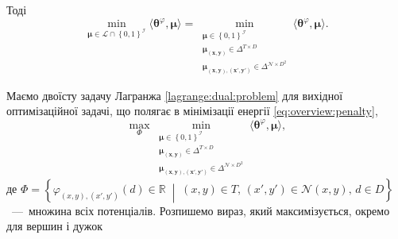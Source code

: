 Тоді
\begin{equation*}
    \min \limits_{\pmb{\mu} \in \mathcal{L} \cap \left\{0, 1 \right\}^{\mathcal{I}}}
        \langle \pmb{\theta}^{\varphi}, \pmb{\mu} \rangle =
    \min \limits_{\substack{\pmb{\mu} \in \left\{ 0, 1 \right\}^{\mathcal{I}} \\
                            \pmb{\mu_{\left(x, y \right)}} \in \Delta^{T \times D} \\
                            \pmb{\mu_{\left(x, y \right), \left(x', y' \right)}} \in
                                \Delta^{\mathcal{N} \times D^2}}}
        \langle \pmb{\theta}^{\varphi}, \pmb{\mu} \rangle.
\end{equation*}

Маємо двоїсту задачу Лагранжа \eqref{lagrange:dual:problem}
для вихідної оптимізаційної задачі,
що полягає в мінімізації енергії \eqref{eq:overview:penalty},
\begin{equation*}
    \max \limits_{\Phi}
        \min \limits_{\substack{\pmb{\mu} \in \left\{ 0, 1 \right\}^{\mathcal{I}} \\
                                \pmb{\mu_{\left(x, y \right)}} \in \Delta^{T \times D} \\
                                \pmb{\mu_{\left(x, y \right), \left(x', y' \right)}} \in
                                    \Delta^{\mathcal{N} \times D^2}}}
            \langle \pmb{\theta}^{\varphi}, \pmb{\mu} \rangle,
\end{equation*}
де
$\Phi = \left\{
    \varphi_{\left(x, y \right), \left(x', y' \right)} \left(
        d
    \right) \in \mathbb{R} \; \middle| \;
    \left(x, y \right) \in T, \,
    \left(x', y' \right) \in \mathcal{N} \left(x, y \right), \,
    d \in D
\right\}$~---~множина всіх потенціалів.
Розпишемо вираз, який максимізується, окремо для вершин і дужок
